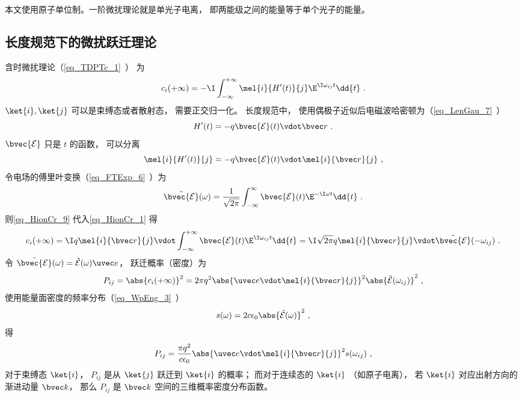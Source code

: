 

本文使用原子单位制。一阶微扰理论就是单光子电离， 即两能级之间的能量等于单个光子的能量。

\subsection{长度规范下的微扰跃迁理论}
含时微扰理论（\autoref{eq_TDPTc_1}~） 为
\begin{equation}\label{eq_HionCr_1}
c_i(+\infty) = -\I \int_{-\infty}^{+\infty} \mel{i}{H'(t)}{j} \E^{\I\omega_{ij} t} \dd{t}~.
\end{equation}
$\ket{i},\ket{j}$ 可以是束缚态或者散射态， 需要正交归一化。 长度规范中， 使用偶极子近似后电磁波哈密顿为（\autoref{eq_LenGau_7}~）
\begin{equation}
H'(t) = -q\bvec {\mathcal E}(t) \vdot \bvec r~.
\end{equation}
$\bvec {\mathcal E}$ 只是 $t$ 的函数， 可以分离
\begin{equation}\label{eq_HionCr_9}
\mel{i}{H'(t)}{j} = -q\bvec {\mathcal E}(t) \vdot \mel{i}{\bvec r}{j}~,
\end{equation}
令电场的傅里叶变换（\autoref{eq_FTExp_6}~）为
\begin{equation}
\tilde {\bvec {\mathcal E}}(\omega) = \frac{1}{\sqrt{2\pi}} \int_{-\infty}^{\infty} \bvec {\mathcal E}(t) \E^{-\I\omega t} \dd{t}~.
\end{equation}
则\autoref{eq_HionCr_9} 代入\autoref{eq_HionCr_1} 得
\begin{equation}\label{eq_HionCr_7}
c_i(+\infty) = \I q \mel{i}{\bvec r}{j} \vdot \int_{-\infty}^{+\infty} \bvec {\mathcal E}(t) \E^{\I\omega_{ij} t} \dd{t} = \I \sqrt{2\pi} q \mel{i}{\bvec r}{j} \vdot \tilde {\bvec {\mathcal E}}(-\omega_{ij})~.
\end{equation}
令 $\tilde {\bvec {\mathcal E}}(\omega) = \tilde {{\mathcal E}}(\omega)\uvec e$， 跃迁概率（密度）为
\begin{equation}\label{eq_HionCr_2}
P_{ij} = \abs{c_i(+\infty)}^2 = 2\pi q^2 \abs{\uvec e \vdot \mel{i}{\bvec r}{j}}^2 \abs{\tilde {{\mathcal E}}(\omega_{ij})}^2~,
\end{equation}
使用能量面密度的频率分布（\autoref{eq_WpEng_3}~）
\begin{equation}\label{eq_HionCr_8}
s(\omega) = 2c\epsilon_0 \abs{\tilde {{\mathcal E}}(\omega)}^2~,
\end{equation}
得
\begin{equation}\label{eq_HionCr_6}
P_{ij} = \frac{\pi q^2}{c\epsilon_0} \abs{\uvec e \vdot\mel{i}{\bvec r}{j}}^2 s(\omega_{ij})~,
\end{equation}
对于束缚态 $\ket{i}$， $P_{ij}$ 是从 $\ket{j}$ 跃迁到 $\ket{i}$ 的概率； 而对于连续态的 $\ket{i}$ （如原子电离）， 若 $\ket{i}$ 对应出射方向的渐进动量 $\bvec k$， 那么 $P_{ij}$ 是 $\bvec k$ 空间的三维概率密度分布函数。

